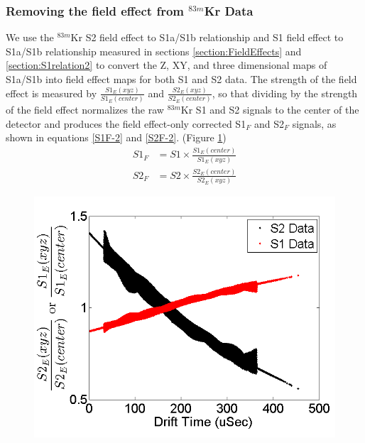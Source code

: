 \subsubsection{Removing the field effect from $^{83m}$Kr Data}

We use the $^{83m}$Kr S2 field effect to S1a/S1b relationship and S1 field effect to S1a/S1b relationship measured in sections \ref{section:FieldEffects} and \ref{section:S1relation2} to convert the Z, XY, and three dimensional maps of S1a/S1b into field effect maps for both S1 and S2 data.  The strength of the field effect is measured by $\frac{S1_E(xyz)}{S1_E(center)}$ and $\frac{S2_E(xyz)}{S2_E(center)}$, so that dividing by the strength of the field effect normalizes the raw $^{83m}$Kr S1 and S2 signals to the center of the detector and produces the field effect-only corrected S1$_F$ and S2$_F$ signals, as shown in equations \ref{S1F-2} and \ref{S2F-2}. (Figure \ref{fig:KrypCalFieldStrength})
\begin{align} 
S1_F &=S1 \times \frac{S1_E(center)}{S1_E(xyz)} \label{S1F-2} \\
S2_F &=S2 \times \frac{S2_E(center)}{S2_E(xyz)} \label{S2F-2}
\end{align}


\begin{figure}[!h]
\includegraphics[scale=0.5]{Run04Corrections/KrypCal_FieldEffect.png}
\label{fig:KrypCalFieldStrength}
\end{figure}

